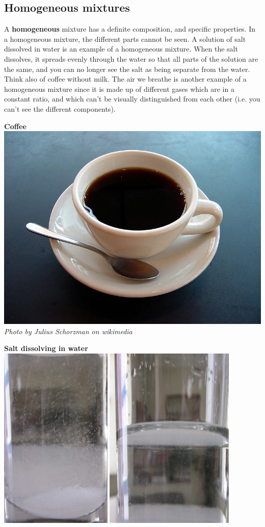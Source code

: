             \subsection*{Homogeneous mixtures}
            \nopagebreak
A \textbf{homogeneous} mixture has a definite composition, and specific properties. In a homogeneous mixture, the different parts cannot be seen. A solution of salt dissolved in water is an example of a homogeneous mixture. When the salt dissolves, it spreads evenly through the water so that all parts of the solution are the same, and you can no longer see the salt as being separate from the water. Think also of coffee without milk. The air we breathe is another example of a homogeneous mixture since it is made up of different gases which are in a constant ratio, and which can't be visually distinguished from each other (i.e. you can't see the different components).\\
\begin{minipage}{.5\textwidth}
\begin{center}
\textbf{Coffee}\\
 \includegraphics[width=.3\textwidth]{photos/coffeeby_JuliusSchorzman_wikimedia.jpg}\\
\textit{Photo by Julius Schorzman on wikimedia}
\end{center}
\end{minipage}
\begin{minipage}{.5\textwidth}
\begin{center}
\textbf{Salt dissolving in water}\\
 \includegraphics[width=.5\textwidth]{photos/saltwater.png}
\end{center}
\end{minipage}


